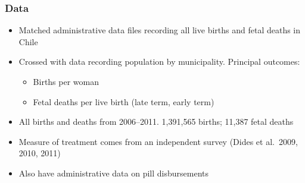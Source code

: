 \documentclass[10pt,letterpaper,subeqn]{beamer}
\begin{document}


\begin{frame}[label=sum]
\frametitle{Data}
\begin{itemize}
\item Matched administrative data files recording all live births and fetal deaths in Chile
\item Crossed with data recording population by municipality.  Principal outcomes:
\begin{itemize}
\item Births per woman
\item Fetal deaths per live birth (late term, early term)
\end{itemize}
\item All births and deaths from 2006--2011.  1,391,565 births; 11,387 fetal deaths
\item Measure of treatment comes from an independent survey (Dides et al.\ 2009, 2010, 2011)
\item Also have administrative data on pill disbursements
\end{itemize}
\hyperlink{sumR}{}
\end{frame}
\end{document}
